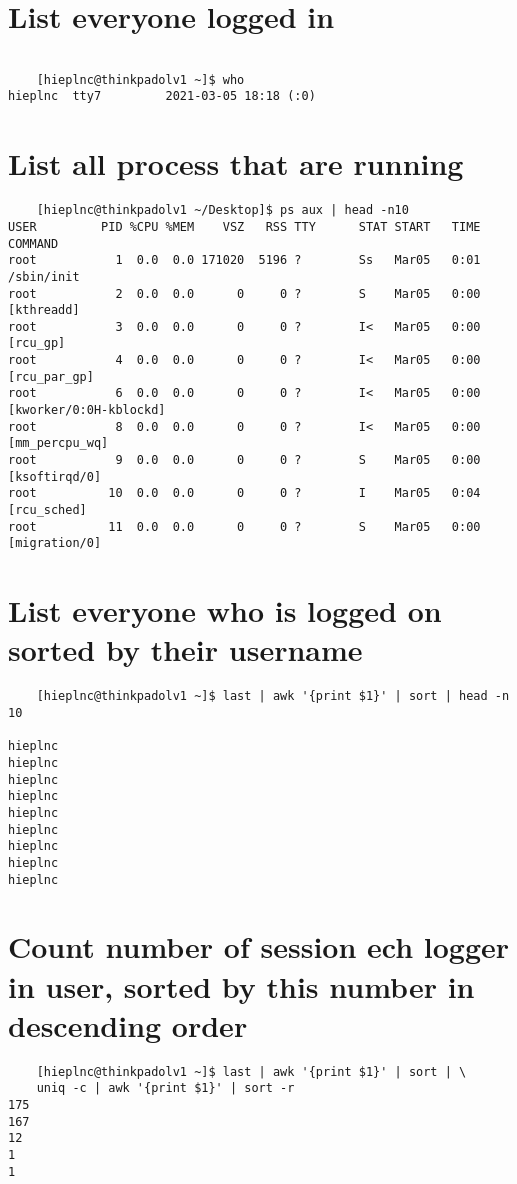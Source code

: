 \documentclass{article}
\begin{document}
	\section{List everyone logged in}
	\begin{verbatim}

	[hieplnc@thinkpadolv1 ~]$ who
hieplnc  tty7         2021-03-05 18:18 (:0)

	\end{verbatim}

	\section{List all process that are running}
	\begin{verbatim}
	[hieplnc@thinkpadolv1 ~/Desktop]$ ps aux | head -n10
USER         PID %CPU %MEM    VSZ   RSS TTY      STAT START   TIME COMMAND
root           1  0.0  0.0 171020  5196 ?        Ss   Mar05   0:01 /sbin/init
root           2  0.0  0.0      0     0 ?        S    Mar05   0:00 [kthreadd]
root           3  0.0  0.0      0     0 ?        I<   Mar05   0:00 [rcu_gp]
root           4  0.0  0.0      0     0 ?        I<   Mar05   0:00 [rcu_par_gp]
root           6  0.0  0.0      0     0 ?        I<   Mar05   0:00 [kworker/0:0H-kblockd]
root           8  0.0  0.0      0     0 ?        I<   Mar05   0:00 [mm_percpu_wq]
root           9  0.0  0.0      0     0 ?        S    Mar05   0:00 [ksoftirqd/0]
root          10  0.0  0.0      0     0 ?        I    Mar05   0:04 [rcu_sched]
root          11  0.0  0.0      0     0 ?        S    Mar05   0:00 [migration/0]
	\end{verbatim}

	\section{List everyone who is logged on sorted by their username}
	\begin{verbatim}
	[hieplnc@thinkpadolv1 ~]$ last | awk '{print $1}' | sort | head -n 10

hieplnc
hieplnc
hieplnc
hieplnc
hieplnc
hieplnc
hieplnc
hieplnc
hieplnc
	\end{verbatim}


	\section{Count number of session ech logger in user, sorted by this number in descending order}
	\begin{verbatim}
	[hieplnc@thinkpadolv1 ~]$ last | awk '{print $1}' | sort | \
	uniq -c | awk '{print $1}' | sort -r
175
167
12
1
1
	\end{verbatim}
\end{document}
